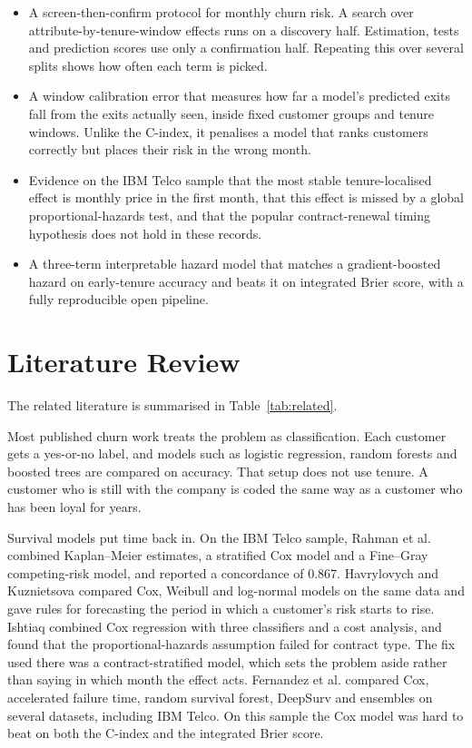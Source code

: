 \documentclass[conference]{IEEEtran}
\begin{document}
\begin{itemize}
\item A screen-then-confirm protocol for monthly churn risk. A search over attribute-by-tenure-window effects runs on a discovery half. Estimation, tests and prediction scores use only a confirmation half. Repeating this over several splits shows how often each term is picked.
\item A window calibration error that measures how far a model's predicted exits fall from the exits actually seen, inside fixed customer groups and tenure windows. Unlike the C-index, it penalises a model that ranks customers correctly but places their risk in the wrong month.
\item Evidence on the IBM Telco sample that the most stable tenure-localised effect is monthly price in the first month, that this effect is missed by a global proportional-hazards test, and that the popular contract-renewal timing hypothesis does not hold in these records.
\item A three-term interpretable hazard model that matches a gradient-boosted hazard on early-tenure accuracy and beats it on integrated Brier score, with a fully reproducible open pipeline.
\end{itemize}

\section{Literature Review}

The related literature is summarised in Table~\ref{tab:related}.

Most published churn work treats the problem as classification. Each customer gets a yes-or-no label, and models such as logistic regression, random forests and boosted trees are compared on accuracy. That setup does not use tenure. A customer who is still with the company is coded the same way as a customer who has been loyal for years.

Survival models put time back in. On the IBM Telco sample, Rahman et al. \cite{rahman2024} combined Kaplan--Meier estimates, a stratified Cox model and a Fine--Gray competing-risk model, and reported a concordance of 0.867. Havrylovych and Kuznietsova \cite{havrylovych2019} compared Cox, Weibull and log-normal models on the same data and gave rules for forecasting the period in which a customer's risk starts to rise. Ishtiaq \cite{ishtiaq2026} combined Cox regression with three classifiers and a cost analysis, and found that the proportional-hazards assumption failed for contract type. The fix used there was a contract-stratified model, which sets the problem aside rather than saying in which month the effect acts. Fernandez et al. \cite{fernandez2024} compared Cox, accelerated failure time, random survival forest, DeepSurv and ensembles on several datasets, including IBM Telco. On this sample the Cox model was hard to beat on both the C-index and the integrated Brier score.
\end{document}
